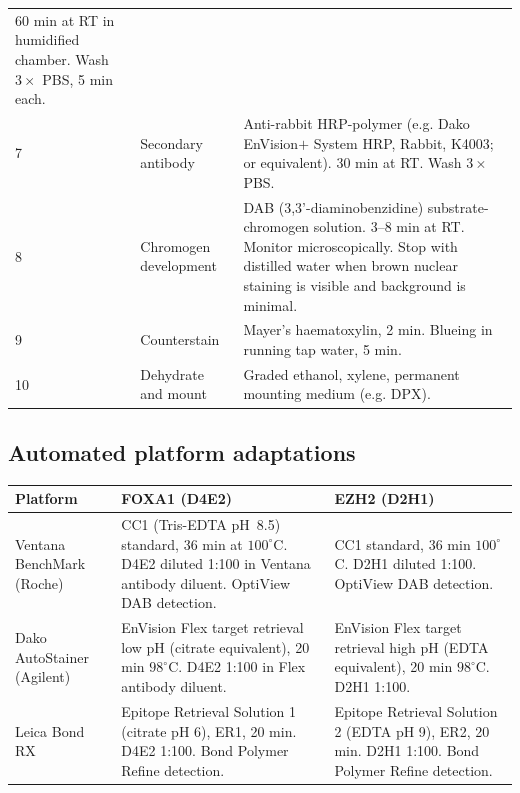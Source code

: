 \documentclass[11pt, a4paper]{article}
\begin{document}
\begin{center}
\begin{tabular}{p{0.8cm}p{5cm}p{7.5cm}}
    60 min at RT in humidified chamber.
    Wash $3\times$ PBS, 5 min each. \\[0.3em]
7 & Secondary antibody &
    Anti-rabbit HRP-polymer
    (e.g. Dako EnVision$+$ System HRP,
    Rabbit, K4003; or equivalent).
    30 min at RT.
    Wash $3\times$ PBS. \\[0.3em]
8 & Chromogen development &
    DAB (3,3'-diaminobenzidine)
    substrate-chromogen solution.
    3--8 min at RT.
    Monitor microscopically.
    Stop with distilled water when
    brown nuclear staining is visible
    and background is minimal. \\[0.3em]
9 & Counterstain &
    Mayer's haematoxylin, 2 min.
    Blueing in running tap water, 5 min. \\[0.3em]
10 & Dehydrate and mount &
    Graded ethanol, xylene, permanent
    mounting medium (e.g. DPX). \\
\bottomrule
\end{tabular}
\end{center}

\subsection{Automated platform adaptations}

\begin{center}
\begin{tabular}{p{3.5cm}p{5cm}p{5cm}}
\toprule
\textbf{Platform} & \textbf{FOXA1 (D4E2)} &
\textbf{EZH2 (D2H1)} \\
\midrule
Ventana BenchMark
(Roche) &
CC1 (Tris-EDTA pH~8.5) standard,
36 min at $100^\circ$C.
D4E2 diluted 1:100 in Ventana
antibody diluent.
OptiView DAB detection. &
CC1 standard, 36 min $100^\circ$C.
D2H1 diluted 1:100.
OptiView DAB detection. \\[0.4em]
Dako AutoStainer
(Agilent) &
EnVision Flex target retrieval
low pH (citrate equivalent),
20 min $98^\circ$C.
D4E2 1:100 in Flex antibody
diluent. &
EnVision Flex target retrieval
high pH (EDTA equivalent),
20 min $98^\circ$C.
D2H1 1:100. \\[0.4em]
Leica Bond RX &
Epitope Retrieval Solution 1
(citrate pH 6), ER1, 20 min.
D4E2 1:100.
Bond Polymer Refine detection. &
Epitope Retrieval Solution 2
(EDTA pH 9), ER2, 20 min.
D2H1 1:100.
Bond Polymer Refine detection. \\
\bottomrule
\end{tabular}
\end{center}

\end{document}
